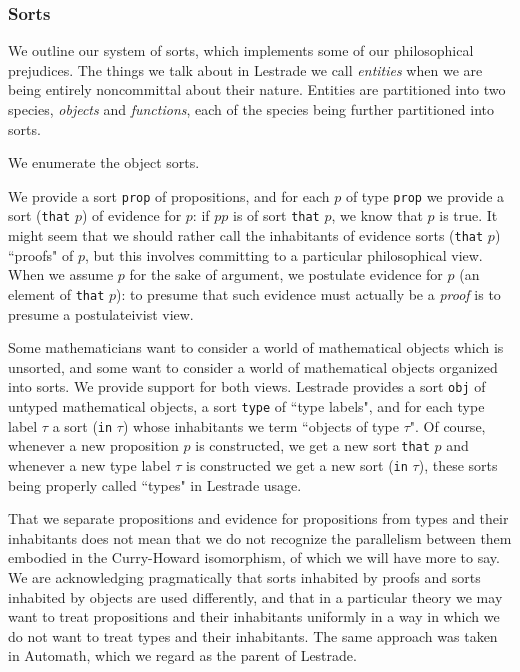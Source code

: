 \documentclass{article}
\begin{document}
\subsubsection{Sorts}

We outline our system of sorts, which implements some of our philosophical prejudices.   The things we talk about in Lestrade we call {\em entities\/} when we are being entirely noncommittal about their nature.  Entities are partitioned into two species, {\em objects\/} and {\em functions\/}, each of the species being further partitioned into sorts. 

We enumerate the object sorts.  

We provide a sort {\tt prop} of propositions, and for each
$p$ of type {\tt prop} we provide a sort ({\tt that} $p$) of evidence for $p$:  if $pp$ is of sort {\tt that} $p$, we know that $p$ is true.    It might seem that we should rather call the inhabitants of evidence sorts ({\tt that} $p$) ``proofs" of $p$, but this involves committing to a particular philosophical view.  When we assume $p$ for the sake of argument, we postulate evidence for $p$ (an element of {\tt that} $p$):  to presume that such evidence must actually be a {\em proof\/} is to presume a postulateivist view.

Some mathematicians want to consider a world of mathematical objects which is unsorted, and some want to consider a world of mathematical objects organized into sorts.  We provide support for both views.  Lestrade provides a sort {\tt obj} of untyped mathematical objects,  a sort {\tt type} of ``type labels", and for each type label
$\tau$ a sort ({\tt in} $\tau$) whose inhabitants we term ``objects of type $\tau$".   Of course, whenever a new proposition $p$ is constructed, we get
a new sort {\tt that} $p$ and whenever a new type label $\tau$ is constructed we get a new sort ({\tt in} $\tau$), these sorts being properly called ``types" in Lestrade usage.

That we separate propositions and evidence for propositions from types and their inhabitants does not mean that we do not recognize the parallelism between them embodied in the Curry-Howard isomorphism, of which we will have more to say.  We are acknowledging pragmatically that sorts inhabited by proofs and sorts inhabited by objects are used differently, and that in a particular theory we may want to treat propositions and their inhabitants uniformly in a way in which we do not want to treat types and their inhabitants.   The same approach was taken in Automath, which we regard as the parent of Lestrade.
\end{document}
